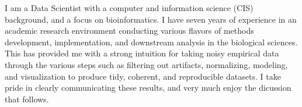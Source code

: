 \documentclass[letterpaper,11pt]{article}
\newcommand{\personalstatement}[1]{
  \begin{center}
  \begin{minipage}[t]{0.96\textwidth}
    \linespread{0.90}\selectfont
    \vspace{.1cm}\small{
      #1 \vspace{1pt}
    }
  \end{minipage}
  \end{center}
}
\begin{document}
\personalstatement{


I am a Data Scientist with a
computer and information science (CIS) background,
and a focus on bioinformatics.
I have seven years of experience in an academic research environment 
conducting various flavors of 
methods development, implementation, and downstream analysis
in the biological sciences.
This has provided me with a strong intuition
for taking noisy empirical data through the various steps 
such as filtering out artifacts, normalizing,  modeling, and visualization
to produce tidy, coherent, and reproducible datasets.
I take pride in clearly communicating these results,
and very much enjoy the dicussion that follows.



}
\end{document}
